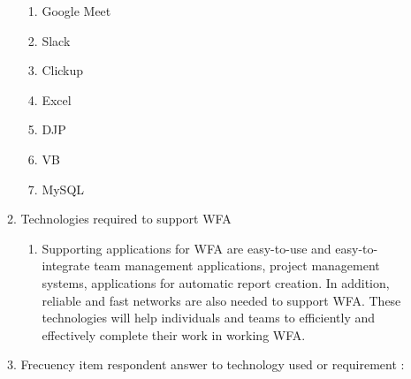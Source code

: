 \documentclass[conference]{IEEEtran}
\begin{document}
\begin{itemize}
\begin{enumerate}
 
\begin{enumerate}
\item Google Meet
\item Slack
\item Clickup
\item Excel
\item DJP
\item VB
\item MySQL
\end{enumerate}
\item Technologies required to support WFA
\begin{enumerate}
\item[] Supporting applications for WFA are easy-to-use and easy-to-integrate team management applications, project management systems, applications for automatic report creation. In addition, reliable and fast networks are also needed to support WFA. These technologies will help individuals and teams to efficiently and effectively complete their work in working WFA.
\end{enumerate}
\item Frecuency item respondent answer to technology used or requirement :



\end{enumerate}
\end{itemize}
\end{document}

